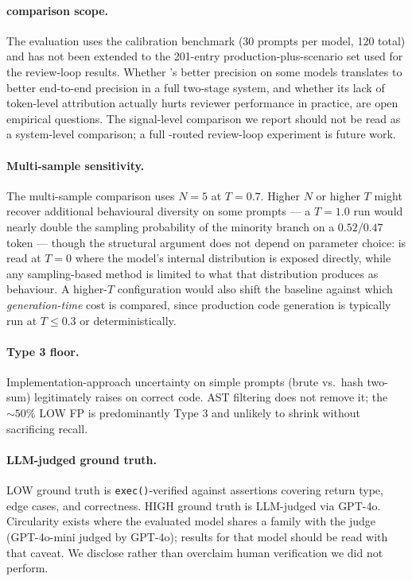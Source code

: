 \paragraph{\papg comparison scope.} The \papg evaluation uses the
calibration benchmark (30 prompts per model, 120 total) and has not
been extended to the 201-entry production-plus-scenario set used for
the review-loop results. Whether \papg's better precision on some
models translates to better end-to-end precision in a full two-stage
system, and whether its lack of token-level attribution actually
hurts reviewer performance in practice, are open empirical questions.
The signal-level comparison we report should not be read as a
system-level comparison; a full \papg-routed review-loop experiment
is future work.

\paragraph{Multi-sample sensitivity.} The multi-sample comparison uses
$N=5$ at $T=0.7$. Higher $N$ or higher $T$ might recover additional
behavioural diversity on some prompts --- a $T=1.0$ run would nearly
double the sampling probability of the minority branch on a $0.52/0.47$
token --- though the structural argument does not depend on parameter
choice: \eps is read at $T=0$ where the model's internal distribution
is exposed directly, while any sampling-based method is limited to
what that distribution produces as behaviour. A higher-$T$
configuration would also shift the baseline against which
\emph{generation-time} cost is compared, since production code
generation is typically run at $T \le 0.3$ or deterministically.

\paragraph{Type 3 floor.} Implementation-approach uncertainty on
simple prompts (brute vs.\ hash two-sum) legitimately raises \eps on
correct code. AST filtering does not remove it; the $\sim 50\%$ LOW
FP is predominantly Type 3 and unlikely to shrink without sacrificing
recall.

\paragraph{LLM-judged ground truth.}\label{subsec:gt-disclosure}
LOW ground truth is \texttt{exec()}-verified against assertions
covering return type, edge cases, and correctness. HIGH ground truth
is LLM-judged via GPT-4o. Circularity exists where the evaluated
model shares a family with the judge (GPT-4o-mini judged by GPT-4o);
results for that model should be read with that caveat. We disclose
rather than overclaim human verification we did not perform.

